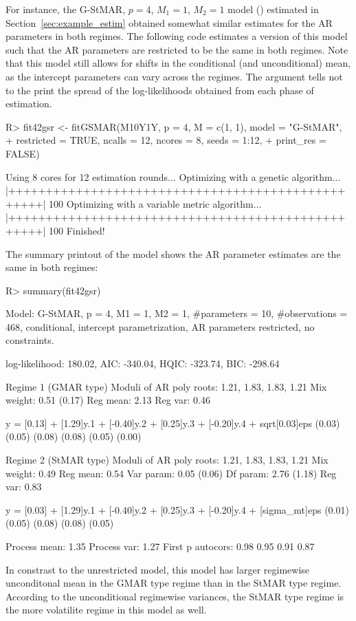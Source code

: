 \documentclass[nojss]{jss} %
\begin{document}
For instance, the G-StMAR, $p=4$, $M_1=1$, $M_2=1$ model () estimated in Section~\ref{sec:example_estim} obtained somewhat similar estimates for the AR parameters in both regimes. The following code estimates a version of this model such that the AR parameters are restricted to be the same in both regimes. Note that this model still allows for shifts in the conditional (and unconditional) mean, as the intercept parameters can vary across the regimes. The argument  tells  not to the print the spread of the log-likelihoods obtained from each phase of estimation.
%
\begin{CodeChunk}
\begin{CodeInput}
R> fit42gsr <- fitGSMAR(M10Y1Y, p = 4, M = c(1, 1), model = "G-StMAR",
+    restricted = TRUE, ncalls = 12, ncores = 8, seeds = 1:12,
+    print_res = FALSE)
\end{CodeInput}
\begin{CodeOutput}
Using 8 cores for 12 estimation rounds...
Optimizing with a genetic algorithm...
  |++++++++++++++++++++++++++++++++++++++++++++++++++| 100%
Optimizing with a variable metric algorithm...
  |++++++++++++++++++++++++++++++++++++++++++++++++++| 100%
Finished!
\end{CodeOutput}
\end{CodeChunk}
%
The summary printout of the model shows the AR parameter estimates are the same in both regimes:
%
\begin{CodeChunk}
\begin{CodeInput}
R> summary(fit42gsr)
\end{CodeInput}
\begin{CodeOutput}
Model:
 G-StMAR, p = 4, M1 = 1, M2 = 1, #parameters = 10, #observations = 468,
 conditional, intercept parametrization, AR parameters restricted, no
 constraints.

 log-likelihood: 180.02, AIC: -340.04, HQIC: -323.74, BIC: -298.64

Regime 1 (GMAR type)
Moduli of AR poly roots: 1.21, 1.83, 1.83, 1.21
Mix weight: 0.51 (0.17)
Reg mean: 2.13
Reg var:  0.46

y = [0.13] + [1.29]y.1 + [-0.40]y.2 + [0.25]y.3 + [-0.20]y.4 + sqrt[0.03]eps
    (0.03)   (0.05)       (0.08)      (0.08)       (0.05)          (0.00)

Regime 2 (StMAR type)
Moduli of AR poly roots: 1.21, 1.83, 1.83, 1.21
Mix weight: 0.49
Reg mean: 0.54
Var param: 0.05 (0.06)
Df param: 2.76 (1.18)
Reg var:  0.83

y = [0.03] + [1.29]y.1 + [-0.40]y.2 + [0.25]y.3 + [-0.20]y.4 + [sigma_mt]eps
    (0.01)   (0.05)       (0.08)      (0.08)       (0.05)

Process mean: 1.35
Process var:  1.27
First p autocors: 0.98 0.95 0.91 0.87
\end{CodeOutput}
\end{CodeChunk}
%
In constrast to the unrestricted model, this model has larger regimewise unconditonal mean in the GMAR type regime than in the StMAR type regime. According to the unconditional regimewise variances, the StMAR type regime is the more volatilite regime in this model as well.
\end{document}
